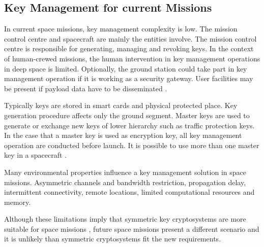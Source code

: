  
 



\subsection{Key Management for current Missions}

In current space missions, key management complexity is low.  The mission control centre and spacecraft are mainly the entities involve. The mission control centre is responsible for generating, managing and revoking keys. In the context of human-crewed missions, the human intervention in key management operations in deep space is limited. Optionally, the ground station could take part in key management operation if it is working as a security gateway. User facilities may be present if payload data have to be disseminated \cite{book2011space}. 


Typically keys are stored in smart cards and physical protected place. Key generation procedure affects only the ground segment. Master keys are used to generate or exchange new keys of lower hierarchy such as traffic protection keys. In the case that a master key is used as encryption key, all key management operation are conducted before launch. It is possible to use more than one master key in a spacecraft \cite{book2011space}.

Many environmental properties influence a key management solution in space missions. Asymmetric channels and bandwidth restriction, propagation delay, intermittent connectivity, remote locations, limited computational resources and memory. 

Although these limitations imply that symmetric key cryptosystems are more suitable for space missions \cite{book2011space}, future space missions present a different scenario and it is unlikely than symmetric cryptosystems fit the new requirements.

